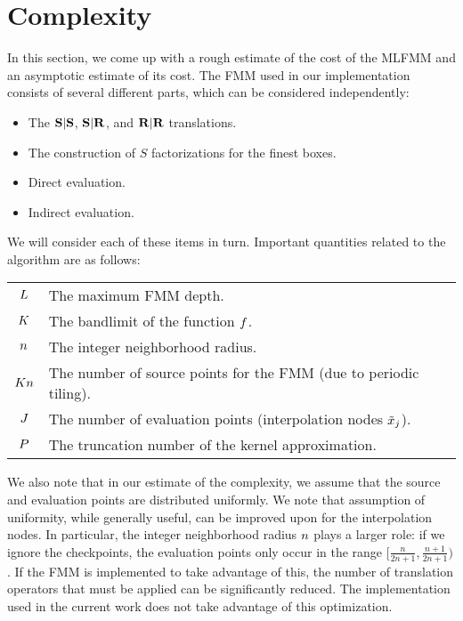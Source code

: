 \section{Complexity}

In this section, we come up with a rough estimate of the cost of the
MLFMM and an asymptotic estimate of its cost. The FMM used in our
implementation consists of several different parts, which can be
considered independently:
\begin{itemize}
\item The $\bold{S}|\bold{S}$, $\bold{S}|\bold{R}$, and $\bold{R}|\bold{R}$ translations.
\item The construction of $S$ factorizations for the finest boxes.
\item Direct evaluation.
\item Indirect evaluation.
\end{itemize}
We will consider each of these items in turn. Important quantities
related to the algorithm are as follows:
\begin{center}
  \begin{tabular}{cl}
    $L$ & The maximum FMM depth. \\
    $K$ & The bandlimit of the function $f$. \\
    $n$ & The integer neighborhood radius. \\
    $Kn$ & The number of source points for the FMM (due to periodic tiling).\@ \\
    $J$ & The number of evaluation points (interpolation nodes ${\tilde{x}}_{j}$). \\
    $P$ & The truncation number of the kernel approximation.
  \end{tabular}
\end{center}
We also note that in our estimate of the complexity, we assume that
the source and evaluation points are distributed uniformly. We note
that assumption of uniformity, while generally useful, can be improved
upon for the interpolation nodes. In particular, the integer
neighborhood radius $n$ plays a larger role: if we
ignore the checkpoints, the evaluation points only occur in the range
$[\tfrac{n}{2n+1}, \tfrac{n+1}{2n+1})$.  If the FMM is implemented to
take advantage of this, the number of translation operators that must
be applied can be significantly reduced. The implementation used in
the current work does not take advantage of this optimization.

